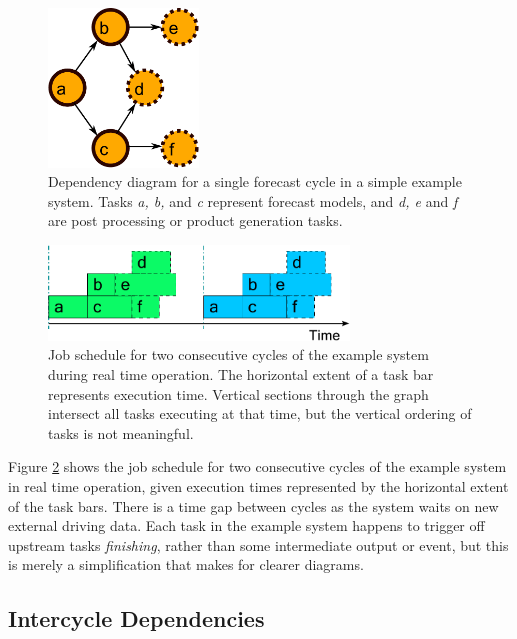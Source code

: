 \documentclass[11pt,a4paper]{article}
\begin{document}
\begin{figure} 
    \begin{center}
    \includegraphics[width=4cm]{dependencies-one} 
    \end{center}
    \caption{\small Dependency diagram for a single forecast cycle in a
    simple example system. Tasks {\em a, b,} and {\em c} represent
    forecast models, and {\em d, e} and {\em f} are post processing or
    product generation tasks.} 
    \label{fig-dep-one} 
\end{figure} 

\begin{figure}
    \begin{center}
        \includegraphics[width=8cm]{timeline-one}
    \end{center}
    \caption{\small Job schedule for two consecutive cycles of
the example system during real time operation. The horizontal extent of
a task bar represents execution time. Vertical sections through the
graph intersect all tasks executing at that time, but the vertical
ordering of tasks is not meaningful.}
    \label{fig-time-one}
\end{figure}

Figure \ref{fig-time-one} shows the job schedule for two consecutive
cycles of the example system in real time operation, given execution
times represented by the horizontal extent of the task bars. There is a
time gap between cycles as the system waits on new external driving
data.  Each task in the example system happens to trigger off upstream
tasks {\em finishing}, rather than some intermediate output or event,
but this is merely a simplification that makes for clearer diagrams.

\subsection{Intercycle Dependencies}
\end{document}
